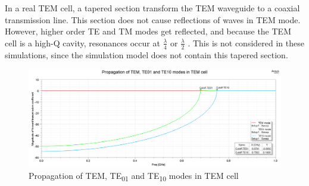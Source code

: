 
In a real TEM cell, a tapered section transform the TEM waveguide to a coaxial transmission line. This section does not cause reflections of waves in TEM mode. However, higher order TE and TM modes get reflected, and because the TEM cell is a high-Q cavity, resonances occur at $\frac{\lambda}{4}$ or $\frac{\lambda}{2}$ \cite{990711}. This is not considered in these simulations, since the simulation model does not contain this tapered section. 




\begin{figure}[h]
    \centering
    \includegraphics[width=1\linewidth]{content//10_theory//img/te01_te10_tem_propagation.png}
    \caption{Propagation of TEM, TE\textsubscript{01} and TE\textsubscript{10} modes in TEM cell}
    \label{fig:te01_te10_tem_propagation}
\end{figure}




